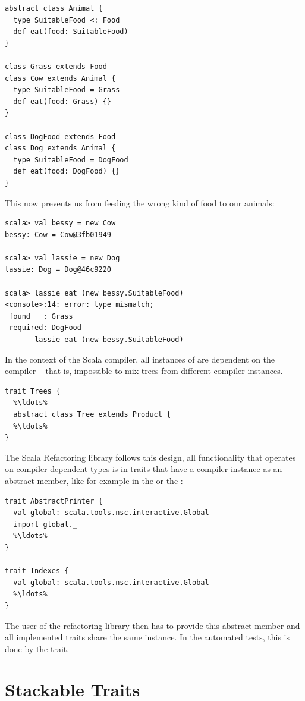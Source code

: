 \documentclass[10pt,a4paper,oneside]{scrreprt}
\begin{document}
{\begin{lstlisting}
abstract class Animal {
  type SuitableFood <: Food
  def eat(food: SuitableFood)
}

class Grass extends Food
class Cow extends Animal {
  type SuitableFood = Grass
  def eat(food: Grass) {}
}

class DogFood extends Food
class Dog extends Animal {
  type SuitableFood = DogFood
  def eat(food: DogFood) {}
}
\end{lstlisting}

This now prevents us from feeding the wrong kind of food to our animals:

\begin{lstlisting}
scala> val bessy = new Cow
bessy: Cow = Cow@3fb01949

scala> val lassie = new Dog
lassie: Dog = Dog@46c9220

scala> lassie eat (new bessy.SuitableFood)
<console>:14: error: type mismatch;
 found   : Grass
 required: DogFood
       lassie eat (new bessy.SuitableFood)
\end{lstlisting}

In the context of the Scala compiler, all instances of  are dependent on the compiler -- that is, impossible to mix trees from different compiler instances.

\begin{lstlisting}
trait Trees {
  %\ldots%
  abstract class Tree extends Product {
  %\ldots%
}
\end{lstlisting}

The Scala Refactoring library follows this design, all functionality that operates on compiler dependent types is in traits that have a compiler instance as an abstract member, like for example in the  or the :

\begin{lstlisting}
trait AbstractPrinter {
  val global: scala.tools.nsc.interactive.Global
  import global._
  %\ldots%
}

trait Indexes {
  val global: scala.tools.nsc.interactive.Global
  %\ldots%
}
\end{lstlisting}

The user of the refactoring library then has to provide this abstract member and all implemented traits share the same instance. In the automated tests, this is done by the  trait.

\section{Stackable Traits} \label{section:stackable-traits}

}
\end{document}
